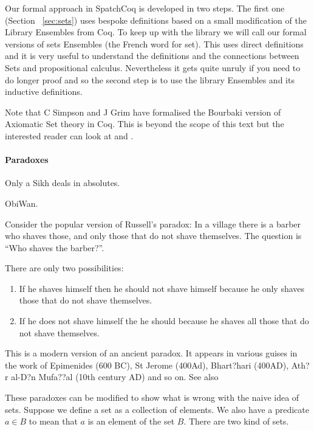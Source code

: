 Our formal approach in SpatchCoq is developed in two steps. The first one (Section~ \ref{sec:sets}) uses bespoke definitions based on a small modification of the Library Ensembles from Coq. To keep up with the library we will call our formal versions of sets Ensembles (the French word for set). This uses direct definitions and it is very useful to understand the definitions and the connections between Sets and propositional calculus. Nevertheless it gets quite unruly if you need to do longer proof and so the second step is to use the library Ensembles and its inductive definitions.

Note that C Simpson and J Grim have formalised the Bourbaki version of Axiomatic Set theory in Coq. This is beyond the scope of this text but the interested reader can look at  \cite{simp04} and \cite{grimm}.
 \paragraph{\bf Paradoxes}\label{sec:paradoxes} 
 \epigraph{Only a Sikh deals in absolutes. }{ ObiWan.}
 
 Consider the popular version of Russell's paradox: In a village there is a barber who shaves those, and only those that do not shave themselves. The question is ``Who shaves the barber?''. 
 
 There are only two possibilities:
 \begin{enumerate}
 \item If he shaves himself then he should not shave himself because he only shaves those that do not shave themselves.
 \item If he does not shave himself the he should because he shaves all those that do not shave themselves.
 \end{enumerate}
 
 This is a modern version of an ancient paradox. It appears in various guises in the work of  Epimenides (600 BC), St Jerome (400Ad), Bhart?hari (400AD), Ath?r al-D?n Mufa??al (10th century AD) and so on. See also  
 
These paradoxes can be modified to show   what is wrong with the naive idea of sets. Suppose we define a set as a collection of elements. We also have a predicate $a\in B$ to mean that $a$ is an element of the set $B$. There are two kind of sets.

